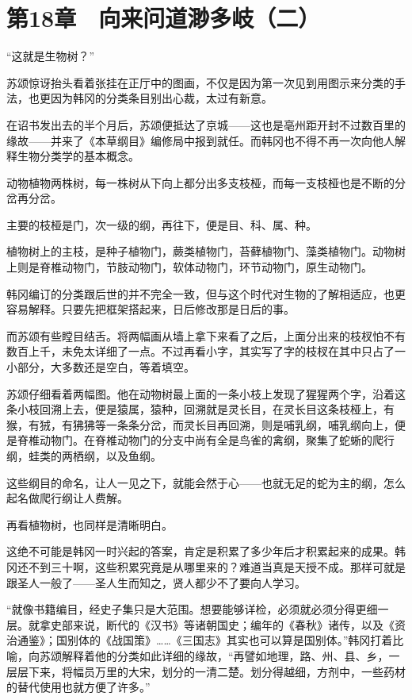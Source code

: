 \section{第18章　向来问道渺多岐（二）}

“这就是生物树？”

苏颂惊讶抬头看着张挂在正厅中的图画，不仅是因为第一次见到用图示来分类的手法，也更因为韩冈的分类条目别出心裁，太过有新意。

在诏书发出去的半个月后，苏颂便抵达了京城——这也是亳州距开封不过数百里的缘故——并来了《本草纲目》编修局中报到就任。而韩冈也不得不再一次向他人解释生物分类学的基本概念。

动物植物两株树，每一株树从下向上都分出多支枝桠，而每一支枝桠也是不断的分岔再分岔。

主要的枝桠是门，次一级的纲，再往下，便是目、科、属、种。

植物树上的主枝，是种子植物门，蕨类植物门，苔藓植物门、藻类植物门。动物树上则是脊椎动物门，节肢动物门，软体动物门，环节动物门，原生动物门。

韩冈编订的分类跟后世的并不完全一致，但与这个时代对生物的了解相适应，也更容易解释。只要先把框架搭起来，日后修改那是日后的事。

而苏颂有些瞠目结舌。将两幅画从墙上拿下来看了之后，上面分出来的枝杈怕不有数百上千，未免太详细了一点。不过再看小字，其实写了字的枝杈在其中只占了一小部分，大多数还是空白，等着填空。

苏颂仔细看着两幅图。他在动物树最上面的一条小枝上发现了猩猩两个字，沿着这条小枝回溯上去，便是猿属，猿种，回溯就是灵长目，在灵长目这条枝桠上，有猴，有狨，有狒狒等一条条分岔，而灵长目再回溯，则是哺乳纲，哺乳纲向上，便是脊椎动物门。在脊椎动物门的分支中尚有全是鸟雀的禽纲，聚集了蛇蜥的爬行纲，蛙类的两栖纲，以及鱼纲。

这些纲目的命名，让人一见之下，就能会然于心——也就无足的蛇为主的纲，怎么起名做爬行纲让人费解。

再看植物树，也同样是清晰明白。

这绝不可能是韩冈一时兴起的答案，肯定是积累了多少年后才积累起来的成果。韩冈还不到三十啊，这些积累究竟是从哪里来的？难道当真是天授不成。那样可就是跟圣人一般了——圣人生而知之，贤人都少不了要向人学习。

“就像书籍编目，经史子集只是大范围。想要能够详检，必须就必须分得更细一层。就拿史部来说，断代的《汉书》等诸朝国史；编年的《春秋》诸传，以及《资治通鉴》；国别体的《战国策》……《三国志》其实也可以算是国别体。”韩冈打着比喻，向苏颂解释着他的分类如此详细的缘故，“再譬如地理，路、州、县、乡，一层层下来，将幅员万里的大宋，划分的一清二楚。划分得越细，方剂中，一些药材的替代使用也就方便了许多。”

